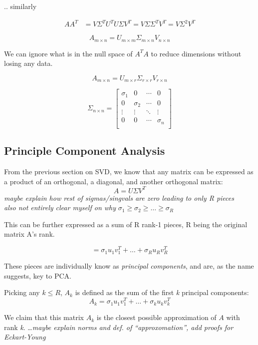 \documentclass[12pt]{article}
\theoremstyle{definition}
\begin{document}
.. similarly

\begin{align*}
	A A^T &=  V \Sigma^T U^T  U \Sigma V^T
	= V \Sigma \Sigma^T V^T  
	= V \Sigma^2 V^T 
\end{align*}






\[
A_{m\times n} = U_{m\times m} \Sigma_{m\times n} V_{n\times n} 
\]

We can ignore what is in the null space of $A^T A$ to reduce dimensions without losing any data.

\[
A_{m\times n} = U_{m\times r} \Sigma_{r\times r} V_{r\times n} 
\]

\[
\Sigma_{n\times n} =
\left[ {\begin{array}{cccc}
		\sigma_{1} & 0 & \cdots & 0       \\
		0 & \sigma_{2} & \cdots & 0 \\
		\vdots & \vdots   & \ddots & \vdots	\\
		0 & 0 & \cdots  & \sigma_{n}\\
\end{array} } \right]
\]




\subsection{Principle Component Analysis}

From the previous section on SVD, we know that any matrix can be expressed as a product of an orthogonal, a diagonal, and another orthogonal matrix:
$$
A = U \Sigma V^T
$$ 
\textit{maybe explain how rest of sigmas/singvals are zero leading to only R pieces} \\
\textit{also not entirely clear myself on why} $\sigma_1 \ge \sigma_2 \ge \ldots \ge \sigma_R$

This can be further expressed as a sum of R rank-1 pieces, R being the original matrix A's rank.

$$
= \sigma_1 u_1 v_1^T + \ldots + \sigma_R u_R v_R^T
$$ 


These pieces are individually know as \textit{principal components}, and are, as the name suggests, key to PCA. 

Picking any $k \le R$, $A_k$ is defined as the sum of the first \textit{k} principal components: 
$$
A_k = \sigma_1 u_1 v_1^T + \ldots + \sigma_k u_k v_k^T
$$ 

We claim that this matrix $A_k$ is the closest possible approximation of $A$ with rank \textit{k}.
\ldots \textit{maybe explain norms and def. of ``approxomation'', add proofs for Eckart-Young}
\end{document}
